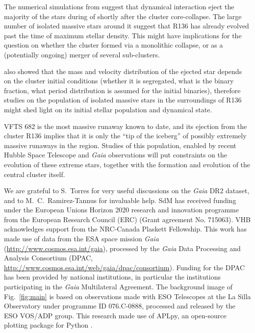 \documentclass[apjl,twocolumn]{emulateapj}
\DeclareRobustCommand{\Figref}[1]{Fig.~\ref{#1}}
\begin{document}
The numerical simulations from \cite{oh:16} suggest that dynamical
interaction eject the majority of the stars during of shortly after the cluster
core-collapse. The large number of isolated massive stars around it
suggest that R136 has already evolved past the
time of maximum stellar density. This might have implications for the
question on whether the cluster formed via a monolithic collapse, or
as a (potentially ongoing) merger of several sub-clusters.

\citet{oh:16} also showed that the mass and velocity distribution of the ejected star depends on the cluster initial conditions
(whether it is segregated, what is the binary fraction, what period
distribution is assumed for the initial binaries), therefore studies on
the population of isolated massive stars in the surroundings of R136
might shed light on its initial stellar population and dynamical
state. 

VFTS 682 is the most massive runaway known to date, and its ejection
from the cluster R136 implies that it is only the ``tip of the
iceberg'' of possibly extremely massive runaways in the
region. Studies of this population, enabled by recent Hubble Space
Telescope and \emph{Gaia} observations will put constraints on the evolution
of these extreme stars, together with the formation and evolution of
the central cluster itself.




\begin{acknowledgements}
  \small
  We are grateful to S.~Torres for 
  very useful discussions on the
  \emph{Gaia} DR2 dataset, and to M.~C.~Ramirez-Tannus for invaluable help.
  SdM has received funding under the European Unions Horizon 2020 research and innovation programme from the European Research
  Council (ERC) (Grant agreement No. 715063). VHB acknowledges support from the NRC-Canada Plaskett Fellowship.
  This work has made use of data from the ESA space mission \emph{Gaia} (\url{http://www.cosmos.esa.int/gaia}), processed by the \emph{Gaia} Data Processing and Analysis Consortium (DPAC, \url{http://www.cosmos.esa.int/web/gaia/dpac/consortium}). Funding for the DPAC has been provided by national institutions, in particular the institutions participating in the \emph{Gaia} Multilateral Agreement. 
  The background image of \Figref{fig:main} is based on observations
  made with ESO Telescopes at the La Silla Observatory under programme
  ID 076.C-0888, processed and released by the ESO VOS/ADP group.
  This research made use of APLpy, an open-source plotting package for Python \citep[][]{robitaille:12}.
\end{acknowledgements}
\end{document}
